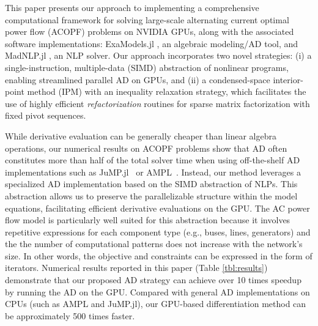\documentclass{IEEEtran4PSCC} %
\begin{document}


This paper presents our approach to implementing a comprehensive
computational framework for solving large-scale alternating current optimal power flow (ACOPF) problems on
NVIDIA GPUs, along with the associated software implementations:
ExaModels.jl \cite{simdiff}, an algebraic modeling/AD tool, and MadNLP.jl \cite{madnlp}, an
NLP solver. Our approach incorporates two novel strategies: (i) a
single-instruction, multiple-data (SIMD) abstraction of nonlinear
programs, enabling streamlined parallel AD on GPUs, and (ii) a
condensed-space interior-point method (IPM) with an inequality
relaxation strategy, which facilitates the use of highly efficient
{\it refactorization} routines for sparse matrix factorization with
fixed pivot sequences.


While derivative evaluation can be generally cheaper than linear
algebra operations, our numerical results on ACOPF problems show that
AD often constitutes more than half of the total solver time when
using off-the-shelf AD implementations such as
JuMP.jl~\cite{dunning2017jump} or
AMPL~\cite{fourer1990modeling}. Instead, our method leverages a
specialized AD implementation based on the SIMD abstraction of
NLPs. This abstraction allows us to preserve the parallelizable
structure within the model equations, facilitating efficient
derivative evaluations on the GPU. The AC power flow model is
particularly well suited for this abstraction because it involves
repetitive expressions for each component type (e.g., buses, lines,
generators) and the the number of computational patterns does not
increase with the network's size. {\color{blue} In other words, the
objective and constraints can be expressed in the form of iterators.}
Numerical results reported in this paper (Table \ref{tbl:results})
demonstrate that our proposed {\color{blue} AD strategy} can achieve
over {\color{blue} 10} times speedup by running {\color{blue} the AD} on the GPU. Compared with general AD
implementations on CPUs (such as AMPL and JuMP.jl), our GPU-based
differentiation method can be approximately 500 times faster.
\end{document}
